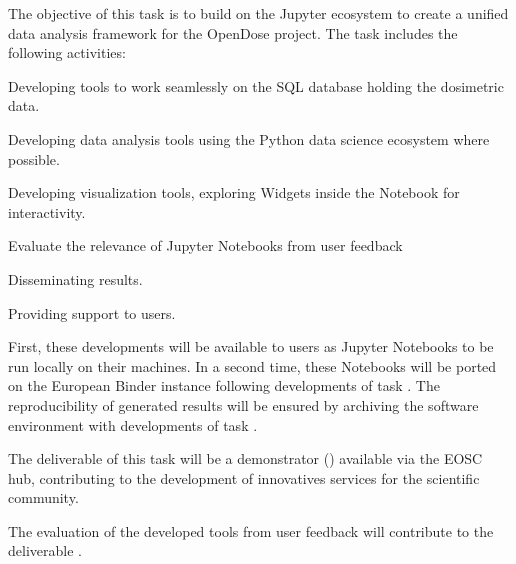 \begin{task}[
  title=Demonstrator: Nuclear Medicine,
  id=opendose-analysis,
  lead=INSERM,
  PM=25,
  wphases={3-33},
  partners={EGI,XFEL}
]


  The objective of this task is to build on the Jupyter ecosystem to create a
  unified data analysis framework for the OpenDose project. 
  The task includes the following activities:
  \begin{compactitem}
  \item Developing tools to work seamlessly on the SQL database holding the
    dosimetric data.
  \item Developing data analysis tools using the Python data science ecosystem
    where possible.
  \item Developing visualization tools, exploring Widgets inside the Notebook
    for interactivity.
  \item Evaluate the relevance of Jupyter Notebooks from user feedback
  \item Disseminating results.
  \item Providing support to users.
  \end{compactitem}
  First, these developments will be available to users as Jupyter Notebooks to
  be run locally on their machines. In a second time, these Notebooks will be
  ported on the European Binder instance following developments of task
  . The reproducibility of generated results will be
  ensured by archiving the software environment with developments of task
  .

  The deliverable of this task will be a demonstrator
  () available via the EOSC hub, contributing
  to the development of innovatives services for the scientific community.

  The evaluation of the developed tools from user feedback will contribute to
  the deliverable .


\end{task}
